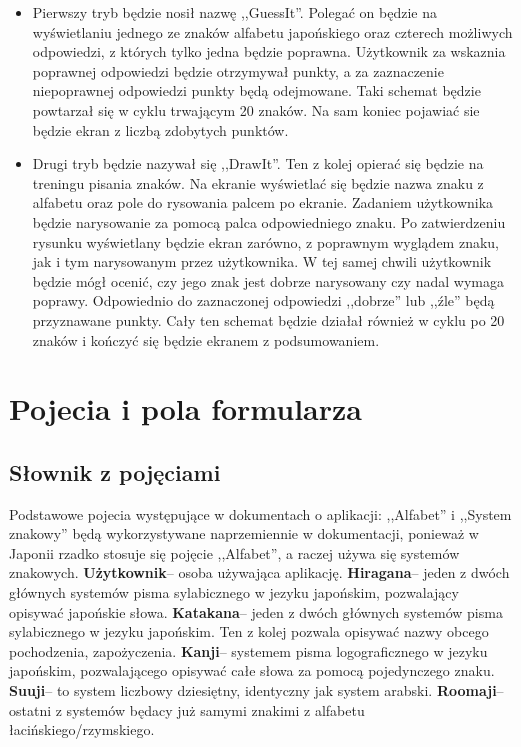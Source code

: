 \documentclass[15pt]{article}
\begin{document}
\begin{itemize}
\item Pierwszy tryb będzie nosił nazwę ,,GuessIt''. Polegać on będzie na wyświetlaniu jednego ze znaków alfabetu japońskiego oraz czterech możliwych odpowiedzi, z których tylko jedna będzie poprawna. Użytkownik za wskaznia poprawnej odpowiedzi będzie otrzymywał punkty, a za zaznaczenie niepoprawnej odpowiedzi punkty będą odejmowane. Taki schemat będzie powtarzał się w cyklu trwającym 20 znaków. Na sam koniec pojawiać sie będzie ekran z liczbą zdobytych punktów. 
\item Drugi tryb będzie nazywał się ,,DrawIt''. Ten z kolej opierać się będzie na treningu pisania znaków. Na ekranie wyświetlać się będzie nazwa znaku z alfabetu oraz pole do rysowania palcem po ekranie. Zadaniem użytkownika będzie narysowanie za pomocą palca odpowiedniego znaku. Po zatwierdzeniu rysunku wyświetlany będzie ekran zarówno, z poprawnym wyglądem znaku, jak i tym narysowanym przez użytkownika. W tej samej chwili użytkownik będzie mógł ocenić, czy jego znak jest dobrze narysowany czy nadal wymaga poprawy. Odpowiednio do zaznaczonej odpowiedzi ,,dobrze'' lub ,,źle'' będą przyznawane punkty. Cały ten schemat będzie działał również w cyklu po 20 znaków i kończyć się będzie ekranem z podsumowaniem.
\end{itemize}

\section{Pojecia i pola formularza}
\subsection{Słownik z pojęciami}
Podstawowe pojecia występujące w dokumentach o aplikacji:
\newline
,,Alfabet'' i ,,System znakowy'' będą wykorzystywane naprzemiennie w dokumentacji, ponieważ w Japonii rzadko stosuje się pojęcie ,,Alfabet'', a raczej używa się systemów znakowych.
\newline
\newline
\textbf{Użytkownik}-- osoba używająca aplikację.
\newline
\textbf{Hiragana}-- jeden z dwóch głównych systemów pisma sylabicznego w jezyku japońskim, pozwalający opisywać japońskie słowa.
\newline
\textbf{Katakana}-- jeden z dwóch głównych systemów pisma sylabicznego w jezyku japońskim. Ten z kolej pozwala opisywać nazwy obcego pochodzenia, zapożyczenia.
\newline
\textbf{Kanji}-- systemem pisma logograficznego w jezyku japońskim, pozwalającego opisywać całe słowa za pomocą pojedynczego znaku.
\newline
\textbf{Suuji}-- to system liczbowy dziesiętny, identyczny jak system arabski.
\newline
\textbf{Roomaji}-- ostatni z systemów będacy już samymi znakimi z alfabetu łacińskiego/rzymskiego.
\end{document}
